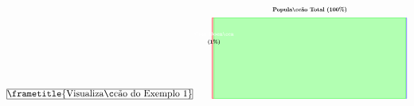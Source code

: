 \documentclass[11pt]{beamer}
\begin{document}
\begin{frame}
\begin{frame}
\begin{align*}
\begin{frame}
\frametitle{Visualização do Exemplo 1}

\begin{tikzpicture}[scale=0.6, transform shape]
\tikzset{
    box/.style={rectangle, draw, thick, minimum height=1.5cm, text width=3.5cm, align=center, font=\small},
    population/.style={rectangle, draw, thick, minimum height=5.0cm, minimum width=12cm, fill=blue!10, draw=blue!50},
    disease/.style={rectangle, draw, thick, fill=red!30, draw=red!50},
    no_disease/.style={rectangle, draw, thick, fill=green!30, draw=green!50},
    positive/.style={rectangle, draw, thick, fill=orange!40, draw=orange!60},
    negative/.style={rectangle, draw, thick, fill=blue!20, draw=blue!40},
    true_positive/.style={rectangle, draw, thick, fill=red!60, draw=red!80},
    false_negative/.style={rectangle, draw, thick, fill=red!20, draw=red!40},
    false_positive/.style={rectangle, draw, thick, fill=green!50, draw=green!70},
    true_negative/.style={rectangle, draw, thick, fill=green!20, draw=green!40},
    annotation/.style={->, >=latex, thick}
}

\def\prevalencia{0.01}
\def\sensibilidade{0.95}
\def\especificidade{0.90}
\def\falsoPositivo{0.10}
\def\testeNegativoDadoDoenca{0.05}
\def\testePositivoDadoSemDoenca{0.10}
\def\testeNegativoDadoSemDoenca{0.90}
\def\larguraTotal{12}
\def\alturaTotal{5}

\pgfmathsetmacro{\doenca}{\prevalencia}
\pgfmathsetmacro{\semDoenca}{1-\prevalencia}
\pgfmathsetmacro{\larguraDoenca}{\larguraTotal*\prevalencia}
\pgfmathsetmacro{\larguraSemDoenca}{\larguraTotal*\semDoenca}
\pgfmathsetmacro{\larguraVP}{\larguraDoenca*\sensibilidade}
\pgfmathsetmacro{\larguraFN}{\larguraDoenca*\testeNegativoDadoDoenca}
\pgfmathsetmacro{\larguraFP}{\larguraSemDoenca*\testePositivoDadoSemDoenca}
\pgfmathsetmacro{\larguraVN}{\larguraSemDoenca*\testeNegativoDadoSemDoenca}

\node[population] (populacao) at (6,2.5) {};
\node[font=\bfseries] at (6,5.5) {População Total (100\%)};

\node[disease] (doentes) at (0.06,2.5) [minimum width=0.12cm, minimum height=5cm] {};
\node[no_disease] (nao_doentes) at (6,2.5) [minimum width=11.88cm, minimum height=5cm] {};

\node[font=\small\bfseries, text=white] at (0.06,4) {Com Doença};
\node[font=\small\bfseries] at (0.06,3.5) {(1\%)};


\end{tikzpicture}
\end{frame}
\end{align*}
\end{frame}
\end{frame}
\end{document}
